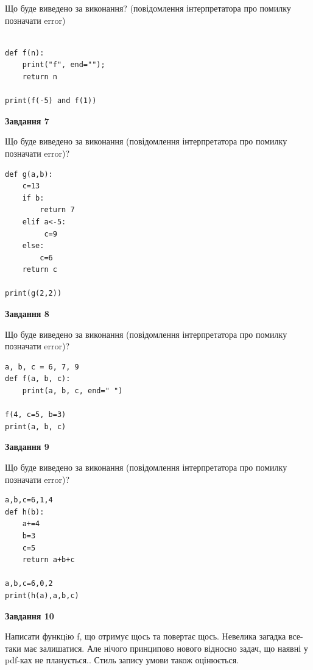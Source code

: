\documentclass[12pt, ukrainian]{article}
\begin{document}
{\begin {large}
Що буде виведено за виконання? (повідомлення інтерпретатора про помилку позначати error)\par
\begin{verbatim}

def f(n):
    print("f", end="");
    return n

print(f(-5) and f(1))
\end{verbatim}

{\begin {center}\textbf{Завдання 7}\end {center}}

Що буде виведено за виконання (повідомлення інтерпретатора про помилку позначати error)?\par
\begin{verbatim}
def g(a,b):
    c=13
    if b:
        return 7
    elif a<-5:
         c=9
    else: 
        c=6
    return c

print(g(2,2))
\end{verbatim}

{\begin {center}\textbf{Завдання 8}\end {center}}

Що буде виведено за виконання (повідомлення інтерпретатора про помилку позначати error)?\par
\begin{verbatim}
a, b, c = 6, 7, 9
def f(a, b, c):
    print(a, b, c, end=" ")

f(4, c=5, b=3)
print(a, b, c)
\end{verbatim}

{\begin {center}\textbf{Завдання 9}\end {center}}

Що буде виведено за виконання (повідомлення інтерпретатора про помилку позначати error)?\par
\begin{verbatim}
a,b,c=6,1,4
def h(b):
    a+=4
    b=3
    c=5
    return a+b+c

a,b,c=6,0,2
print(h(a),a,b,c)
\end{verbatim}

{\begin {center}\textbf{Завдання 10}\end {center}}


Написати функцiю f, що отримує щось та повертає щось. Невелика загадка все-таки має залишатися. Але нічого принципово нового відносно задач, що наявні у pdf-ках не планується.. Стиль запису умови також оцінюється.\par
\end {large}}
\newpage
\end{document}

